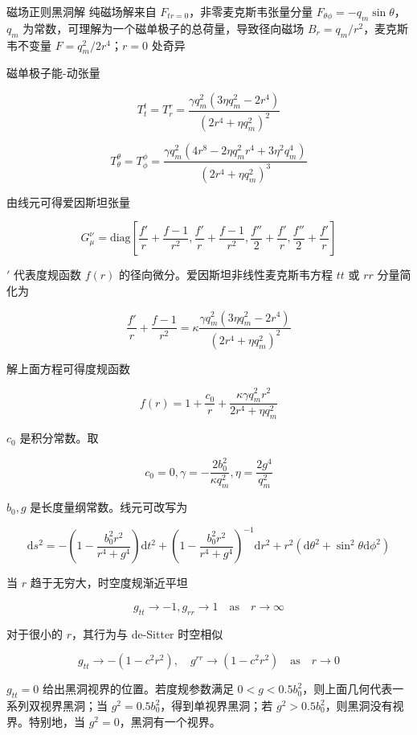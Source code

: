 \documentclass[9pt, dvipsnames]{beamer} %
\begin{document}
\begin{frame}{磁场正则黑洞解 }
    纯磁场解来自 $F_{tr=0} $，非零麦克斯韦张量分量 $F_{\theta\phi}=-q_m \sin\theta $，$q_m $ 为常数，可理解为一个磁单极子的总荷量，导致径向磁场 $B_r=q_m/r^2 $，麦克斯韦不变量 $F=q_m^2/2r^4 $；$r=0 $ 处奇异

    磁单极子能-动张量
    
    $$
    T_t^t
    =T_r^r
    =\frac{\gamma q_m^2\left(3\eta q_m^2-2r^4 \right) }{\left(2r^4+\eta q_m^2 \right)^2 }
    $$
    
    $$
    T_\theta^\theta
    =T_\phi^\phi
    =\frac{\gamma q_m^2\left(4 r^8-2\eta q_m^2 r^4+3\eta^2q_m^4 \right) }{\left(2r^4+\eta q_m^2 \right)^3 }
    $$
    
    由线元可得爱因斯坦张量
    
    $$
    G_\mu^\nu
    =\mathrm{diag}\left[\frac{f' }{r } + \frac{f-1 }{r^2 } ,\frac{f' }{r } + \frac{f-1 }{r^2 } , \frac{f'' }{2 } + \frac{f' }{r } , \frac{f'' }{2 } + \frac{f' }{r }  \right]
    $$
    
    $' $ 代表度规函数 $f(r) $ 的径向微分。爱因斯坦非线性麦克斯韦方程 $tt $ 或 $rr $ 分量简化为
    
    $$
    \frac{f' }{r } + \frac{f-1 }{r^2 } 
    =\kappa \frac{\gamma q_m^2\left(3\eta q_m^2-2r^4 \right) }{\left(2r^4+\eta q_m^2 \right)^2 }
    $$
    
    解上面方程可得度规函数
\end{frame}

\begin{frame}
    $$
    f(r)
    =1+\frac{c_0 }{r } + \frac{\kappa \gamma q_m^2 r^2 }{2r^4+\eta q_m^2 } 
    $$
    
    $c_0 $ 是积分常数。取
    
    $$
    c_0=0,
    \gamma=-\frac{2b_0^2 }{\kappa q_m^2} ,
    \eta=\frac{2g^4 }{q_m^2 }
    $$
    
    $b_0,g $ 是长度量纲常数。线元可改写为
    
    $$
    \mathrm{d}s^2
    =-\left(1-\frac{b_0^2r^2 }{r^4+g^4 }  \right)\mathrm{d}t^2 + \left(1-\frac{b_0^2r^2 }{r^4+g^4 }  \right)^{-1}\mathrm{d}r^2 + r^2\left(\mathrm{d}\theta^2+\sin^2\theta \mathrm{d}\phi^2 \right)
    $$
    
    当 $r$ 趋于无穷大，时空度规渐近平坦
    
    $$
    g_{tt}\to -1,g_{rr}\to 1 \quad \mathrm{as}\quad r\to\infty
    $$
    
    对于很小的 $r$，其行为与 de-Sitter 时空相似
    
    $$
    g_{tt}\to -\left(1-c^2r^2 \right),\quad g^{rr} \to \left(1-c^2r^2 \right)\quad \mathrm{as}\quad r\to 0
    $$
    
    $g_{tt}=0$ 给出黑洞视界的位置。若度规参数满足 $0<g<0.5 b_0^2 $，则上面几何代表一系列双视界黑洞；当 $g^2=0.5b_0^2$，得到单视界黑洞；若 $g^2>0.5b_0^2$，则黑洞没有视界。特别地，当 $g^2=0$，黑洞有一个视界。
\end{frame}
\end{document}
